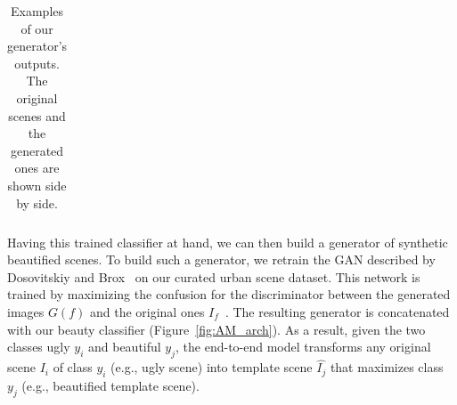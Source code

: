 \begin{table}
\begin{centering}
\begin{tabular}{l*2{C}@{}}
        \bottomrule 
    \end{tabular}
    \caption{Examples of our generator's outputs. The original scenes and the generated ones are shown side by side.}
    \label{fig:GanExample}
    
    \end{centering}
\end{table} 


Having this trained classifier at hand, we can then build a generator of synthetic beautified scenes. To build such a generator, we  retrain the GAN described by Dosovitskiy and Brox~\cite{dosovitskiy2016generating} on our curated urban scene dataset. This network is trained by maximizing the confusion for the discriminator between the generated images $G(f)$ and the original ones $I_f$~\cite{goodfellow2014generative}.  The resulting generator is concatenated with our beauty classifier (Figure~\ref{fig:AM_arch}). As a result, given the two classes ugly $y_i$ and beautiful $y_j$, the end-to-end model  transforms any original scene $I_i$ of class $y_i$ (e.g., ugly scene) into template scene $\hat{I_j}$ that maximizes class $y_j$ (e.g., beautified template scene). 

%
%

